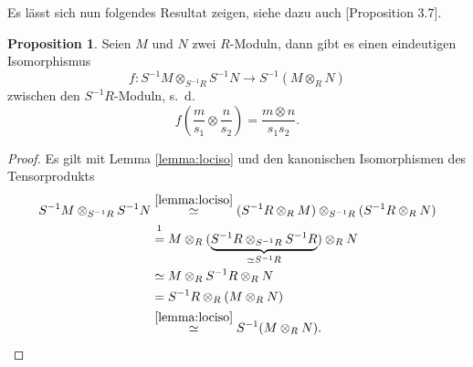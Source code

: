 \documentclass[11pt,titlepage]{article}
\theoremstyle{definition}
\newtheorem{proposition}[theorem]{Proposition}
\theoremstyle{remark}
\begin{document}
	Es lässt sich nun folgendes Resultat zeigen, siehe dazu auch \cite{introductiontocomalg}[Proposition 3.7].
	
	\begin{proposition}\label{prop:tensoriso}
		Seien $M$ und $N$ zwei $R$-Moduln, dann gibt es einen eindeutigen 
		Isomorphismus 
		\[f:S^{-1}M\otimes_{S^{-1}R}S^{-1}N\to S^{-1}(M\otimes_R N)\]
		zwischen den $S^{-1}R$-Moduln, s.~d.
		\[f\left(\frac{m}{s_1}\otimes\frac{n}{s_2}\right)=\frac{m\otimes n}{s_1s_2}.\]
	\end{proposition}

	\begin{proof}
		Es gilt mit Lemma \ref{lemma:lociso} und den kanonischen Isomorphismen des 
		Tensorprodukts
		\begin{align*}
			S^{-1}M\otimes_{S^{-1}R}S^{-1}N &\overset{\ref{lemma:lociso}}{\simeq}
			(S^{-1}R\otimes_R M)\otimes_{S^{-1}R}(S^{-1}R\otimes_R N) \\
			&\overset{\footnotemark}{=}
			 M\otimes_R (\underbrace{S^{-1}R\otimes_{S^{-1}R} S^{-1}R}_{\simeq S^{-1}R})\otimes_R N \\
			&\simeq M\otimes_R S^{-1}R \otimes_R N \\
			&= S^{-1}R \otimes_R(M\otimes_R N) \\
			&\overset{\ref{lemma:lociso}}{\simeq} S^{-1}(M\otimes_R N).
		\end{align*}
	\end{proof}

	
\end{document}
